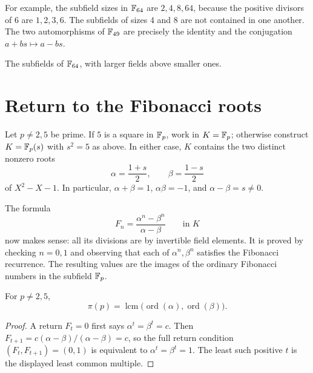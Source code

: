 For example, the subfield sizes in $\mathbb F_{64}$ are $2,4,8,64$, because
the positive divisors of $6$ are $1,2,3,6$. The subfields of sizes $4$
and $8$ are not contained in one another. The two automorphisms of
$\mathbb F_{49}$ are precisely the identity and the conjugation $a+bs\mapsto a-bs$.

\begin{center}

\small The subfields of $\mathbb F_{64}$, with larger fields above smaller ones.
\end{center}

\section{Return to the Fibonacci roots}
\label{sec:fibonacci-field-periods}

Let $p\ne2,5$ be prime. If $5$ is a square in $\mathbb F_p$, work in $K=\mathbb F_p$;
otherwise construct $K=\mathbb F_p(s)$ with $s^2=5$ as above.
In either case, $K$ contains the two distinct nonzero roots
\[
 \alpha=\frac{1+s}{2},\qquad\beta=\frac{1-s}{2}
\]
of $X^2-X-1$. In particular,
$\alpha+\beta=1$, $\alpha\beta=-1$, and $\alpha-\beta=s\ne0$.

The formula
\[
 F_n=\frac{\alpha^n-\beta^n}{\alpha-\beta}\qquad\text{in }K
\]
now makes sense: all its divisions are by invertible field elements.
It is proved by checking $n=0,1$ and observing that each of
$\alpha^n,\beta^n$ satisfies the Fibonacci recurrence.
The resulting values are the images of the ordinary Fibonacci numbers
in the subfield $\mathbb F_p$.

\begin{proposition}
For $p\ne2,5$,
\[
 \pi(p)=\operatorname{lcm}\bigl(\operatorname{ord}(\alpha),
                                  \operatorname{ord}(\beta)\bigr).
\]
\end{proposition}
\begin{proof}
A return $F_t=0$ first says $\alpha^t=\beta^t=c$.
Then $F_{t+1}=c(\alpha-\beta)/(\alpha-\beta)=c$, so the full
return condition $(F_t,F_{t+1})=(0,1)$ is equivalent to
$\alpha^t=\beta^t=1$. The least such positive $t$ is the displayed
least common multiple.
\end{proof}

